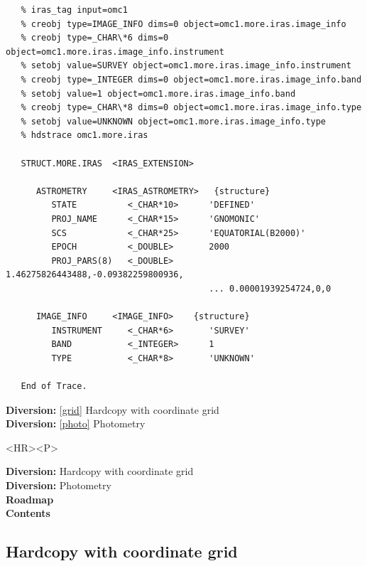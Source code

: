 \documentclass[11pt]{article}
\newenvironment{latexonly}{}{}
\newcommand{\htmlref}[2]{#1}
\newcommand{\xlabel}[1]{}
\begin{document}
\begin{verbatim}
   % iras_tag input=omc1
   % creobj type=IMAGE_INFO dims=0 object=omc1.more.iras.image_info
   % creobj type=_CHAR\*6 dims=0 object=omc1.more.iras.image_info.instrument
   % setobj value=SURVEY object=omc1.more.iras.image_info.instrument
   % creobj type=_INTEGER dims=0 object=omc1.more.iras.image_info.band
   % setobj value=1 object=omc1.more.iras.image_info.band
   % creobj type=_CHAR\*8 dims=0 object=omc1.more.iras.image_info.type
   % setobj value=UNKNOWN object=omc1.more.iras.image_info.type
   % hdstrace omc1.more.iras

   STRUCT.MORE.IRAS  <IRAS_EXTENSION>

      ASTROMETRY     <IRAS_ASTROMETRY>   {structure}
         STATE          <_CHAR*10>      'DEFINED'
         PROJ_NAME      <_CHAR*15>      'GNOMONIC'
         SCS            <_CHAR*25>      'EQUATORIAL(B2000)'
         EPOCH          <_DOUBLE>       2000
         PROJ_PARS(8)   <_DOUBLE>       1.46275826443488,-0.09382259800936,
                                        ... 0.00001939254724,0,0

      IMAGE_INFO     <IMAGE_INFO>    {structure}
         INSTRUMENT     <_CHAR*6>       'SURVEY'
         BAND           <_INTEGER>      1
         TYPE           <_CHAR*8>       'UNKNOWN'

   End of Trace.
\end{verbatim}

\begin{latexonly}
{\bf Diversion:} \ref{grid} Hardcopy with coordinate grid\\
{\bf Diversion:} \ref{photo} Photometry\\
\end{latexonly}

\begin{htmlonly}
\begin{rawhtml} <HR><P> \end{rawhtml}
{\bf \htmlref{Diversion:}{grid}} Hardcopy with coordinate grid\\
{\bf \htmlref{Diversion:}{photo}} Photometry\\
{\bf \htmlref{Roadmap}{roadmap}}\\
{\bf \htmlref{Contents}{stardoccontents}}\\
\end{htmlonly}


\subsection{\label{grid}\xlabel{grid}Hardcopy with coordinate grid}
\end{document}
